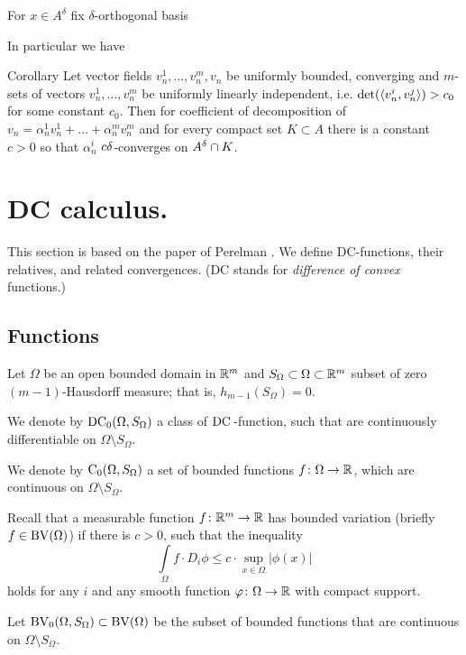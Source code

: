 For $x\in A^\delta$ fix $\delta$-orthogonal basis





In particular we have
\begin{thm}{Corollary}\label{cor:cdeltacoeff}
Let vector fields $v_n^1,\dots, v_n^m, v_n$ be
uniformly bounded, converging
 and $m$-sets of vectors
$v_n^1,\dots, v_n^m$ be uniformly linearly independent,
i.e. $\det(\langle v_n^i, v_n^j\rangle)>c_0$
for some constant $c_0$.
Then for coefficient of decomposition
of $v_n=\alpha_n^1 v_n^1+\dots+\alpha_n^m v_n^m$
 and for every compact
set $K\subset A$ there is a constant $c>0$ so that
$\alpha_n^i$ $c\delta$-converges on $A^\delta\cap K$.
\end{thm}

\section{DC calculus.}\label{sec:DC}

This section is based on the paper of Perelman \cite{PerDC}.
We define DC-functions, their relatives, and related convergences.
(DC stands for \emph{difference of convex} functions.)

\subsection{Functions}

Let $\Omega$ be an open bounded domain in $\mathbb{R}^m$
and $S_\Omega\subset\Omega\subset\mathbb{R}^m $ subset of
zero $(m-1)$-Hausdorff measure; that is, $h_{m-1}(S_\Omega)=0$.

We denote by  $\operatorname{DC_0}(\Omega,S_\Omega)$ a class of
 $\mathrm{DC\,}$-function, such  that are continuously differentiable on
$\Omega\setminus S_\Omega$.

We denote by $\operatorname{C_0}(\Omega,S_\Omega)$ a set of bounded functions
$f\colon\Omega\to\mathbb{R}$, which are continuous on $\Omega\setminus S_\Omega$.

Recall that a measurable function $f\colon\mathbb{R}^m\to \mathbb{R}$ has bounded variation
 (briefly $f\in\operatorname{BV}(\Omega)$) if there is  $c>0$,
such that  the inequality
$$\int\limits_\Omega f\cdot D_i\phi
\le
 c\cdot\sup_{x\in\Omega}|\phi(x)|$$
holds
for any $i$ and any smooth function $\varphi\colon\Omega\to \mathbb{R}$ with compact support.

Let $\operatorname{BV_0}(\Omega,S_\Omega)\subset \operatorname{BV}(\Omega)$ be the subset of bounded functions that are continuous on $\Omega\setminus S_\Omega$.


